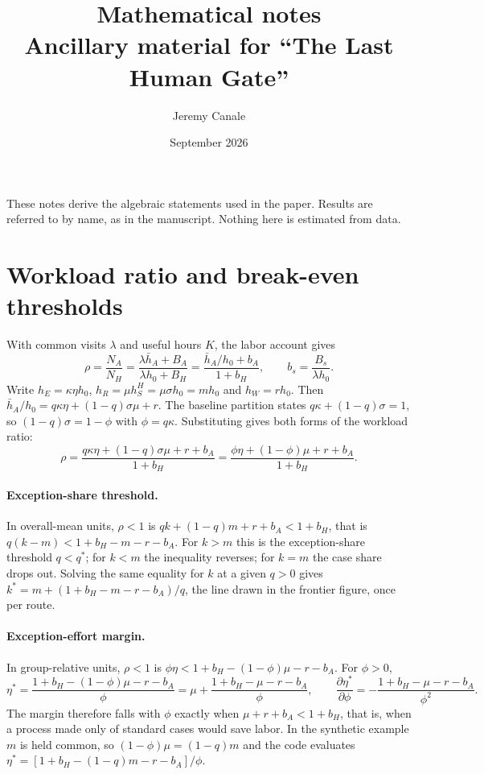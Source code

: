 \documentclass[11pt,a4paper]{article}
\title{\textbf{Mathematical notes}\\[0.3em]\large Ancillary material for
``The Last Human Gate''}
\author{Jeremy Canale}
\date{September 2026}
\begin{document}
\maketitle

These notes derive the algebraic statements used in the paper. Results are referred to by name, as in the manuscript. Nothing here is estimated from data.

\section{Workload ratio and break-even thresholds}

With common visits $\lambda$ and useful hours $K$, the labor account gives
\[
\rho=\frac{N_A}{N_H}=\frac{\lambda\bar h_A+B_A}{\lambda h_0+B_H}
=\frac{\bar h_A/h_0+b_A}{1+b_H},\qquad b_s=\frac{B_s}{\lambda h_0}.
\]
Write $h_E=\kappa\eta h_0$, $h_R=\mu h_S^H=\mu\sigma h_0=mh_0$ and $h_W=rh_0$. Then
$\bar h_A/h_0=q\kappa\eta+(1-q)\sigma\mu+r$. The baseline partition states
$q\kappa+(1-q)\sigma=1$, so $(1-q)\sigma=1-\phi$ with $\phi=q\kappa$. Substituting gives both forms of
the workload ratio:
\[
\rho=\frac{q\kappa\eta+(1-q)\sigma\mu+r+b_A}{1+b_H}=\frac{\phi\eta+(1-\phi)\mu+r+b_A}{1+b_H}.
\]

\paragraph{Exception-share threshold.} In overall-mean units, $\rho<1$ is
$qk+(1-q)m+r+b_A<1+b_H$, that is $q(k-m)<1+b_H-m-r-b_A$. For $k>m$ this is the exception-share threshold $q<q^{*}$;
for $k<m$ the inequality reverses; for $k=m$ the case share drops out. Solving the same equality for
$k$ at a given $q>0$ gives $k^{*}=m+(1+b_H-m-r-b_A)/q$, the line drawn in the frontier figure, once per route.

\paragraph{Exception-effort margin.} In group-relative units, $\rho<1$ is
$\phi\eta<1+b_H-(1-\phi)\mu-r-b_A$. For $\phi>0$,
\[
\eta^{*}=\frac{1+b_H-(1-\phi)\mu-r-b_A}{\phi}=\mu+\frac{1+b_H-\mu-r-b_A}{\phi},
\qquad
\frac{\partial\eta^{*}}{\partial\phi}=-\frac{1+b_H-\mu-r-b_A}{\phi^{2}} .
\]
The margin therefore falls with $\phi$ exactly when $\mu+r+b_A<1+b_H$, that is, when a process made
only of standard cases would save labor. In the synthetic example $m$ is held common, so
$(1-\phi)\mu=(1-q)m$ and the code evaluates $\eta^{*}=[1+b_H-(1-q)m-r-b_A]/\phi$.
\end{document}
